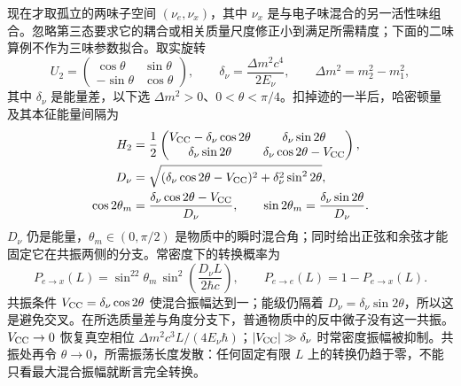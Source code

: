 现在才取孤立的两味子空间 $(\nu_e,\nu_x)$，其中 $\nu_x$ 是与电子味混合的另一活性味组合。忽略第三态要求它的耦合或相关质量尺度修正小到满足所需精度；下面的二味算例不作为三味参数拟合。取实旋转
\begin{equation*}
 U_2=\begin{pmatrix}\cos\theta&\sin\theta\\-\sin\theta&\cos\theta\end{pmatrix},
 \qquad \delta_\nu=\frac{\Delta m^2c^4}{2E_\nu},\qquad
 \Delta m^2=m_2^2-m_1^2,
\end{equation*}
其中 $\delta_\nu$ 是能量差，以下选 $\Delta m^2>0$、$0<\theta<\pi/4$。扣掉迹的一半后，哈密顿量及其本征能量间隔为
\begin{equation}
 \begin{aligned}
 H_2&=\frac12\begin{pmatrix}
 V_{\rm CC}-\delta_\nu\cos2\theta&\delta_\nu\sin2\theta\\
 \delta_\nu\sin2\theta&\delta_\nu\cos2\theta-V_{\rm CC}
 \end{pmatrix},\\
 D_\nu&=\sqrt{(\delta_\nu\cos2\theta-V_{\rm CC})^2
                       +\delta_\nu^2\sin^22\theta},\\
 \cos2\theta_m&=\frac{\delta_\nu\cos2\theta-V_{\rm CC}}{D_\nu},\qquad
 \sin2\theta_m=\frac{\delta_\nu\sin2\theta}{D_\nu}.
 \end{aligned}
 \label{eq:sm-matter-two-flavor}
\end{equation}
$D_\nu$ 仍是能量，$\theta_m\in(0,\pi/2)$ 是物质中的瞬时混合角；同时给出正弦和余弦才能固定它在共振两侧的分支。常密度下的转换概率为
\begin{equation}
 P_{e\to x}(L)=\sin^22\theta_m\,
 \sin^2\!\left(\frac{D_\nu L}{2\hbar c}\right),\qquad
 P_{e\to e}(L)=1-P_{e\to x}(L).
 \label{eq:sm-matter-constant-probability}
\end{equation}
共振条件 $V_{\rm CC}=\delta_\nu\cos2\theta$ 使混合振幅达到一；能级仍隔着 $D_\nu=\delta_\nu\sin2\theta$，所以这是避免交叉。在所选质量差与角度分支下，普通物质中的反中微子没有这一共振。$V_{\rm CC}\to0$ 恢复真空相位 $\Delta m^2c^3L/(4E_\nu\hbar)$；$|V_{\rm CC}|\gg\delta_\nu$ 时常密度振幅被抑制。共振处再令 $\theta\to0$，所需振荡长度发散：任何固定有限 $L$ 上的转换仍趋于零，不能只看最大混合振幅就断言完全转换。

